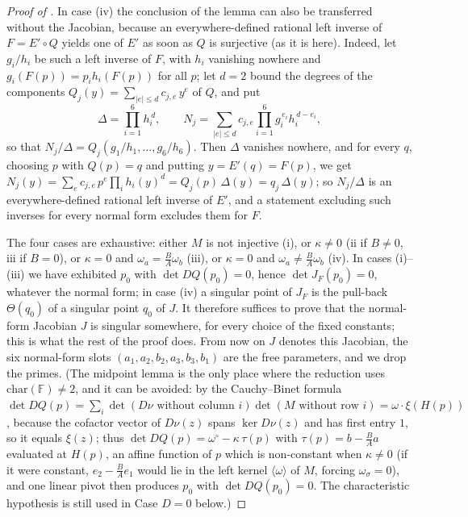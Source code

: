 \begin{proof}[Proof of ]
In case (iv) the conclusion of the lemma can also be transferred without the Jacobian,
because an everywhere-defined rational left inverse of $F=E'\circ Q$ yields one of $E'$
as soon as $Q$ is surjective (as it is here).  Indeed, let $g_i/h_i$ be such a left
inverse of $F$, with $h_i$ vanishing nowhere and $g_i(F(p))=p_ih_i(F(p))$ for all $p$;
let $d=2$ bound the degrees of the components $Q_j(y)=\sum_{|e|\le d}c_{j,e}\,y^e$ of
$Q$, and put
\[
   \Delta=\prod_{i=1}^6h_i^{\,d},\qquad
   N_j=\sum_{|e|\le d}c_{j,e}\prod_{i=1}^6g_i^{\,e_i}h_i^{\,d-e_i},
\]
so that $N_j/\Delta=Q_j(g_1/h_1,\dots,g_6/h_6)$.  Then $\Delta$ vanishes nowhere, and for
every $q$, choosing $p$ with $Q(p)=q$ and putting $y=E'(q)=F(p)$, we get
$N_j(y)=\sum_ec_{j,e}\,p^e\prod_ih_i(y)^d=Q_j(p)\,\Delta(y)=q_j\,\Delta(y)$; so
$N_j/\Delta$ is an everywhere-defined rational left inverse of $E'$, and a statement
excluding such inverses for every normal form excludes them for $F$.

\smallskip
The four cases are exhaustive: either $M$ is not injective (i), or $\kappa\neq0$
(ii if $B\neq0$, iii if $B=0$), or $\kappa=0$ and $\omega_a=\frac BA\omega_b$ (iii), or
$\kappa=0$ and $\omega_a\neq\frac BA\omega_b$ (iv).  In cases (i)--(iii) we have
exhibited $p_0$ with $\det DQ(p_0)=0$, hence $\det J_F(p_0)=0$, whatever the normal
form; in case (iv) a singular point of $J_F$ is the pull-back $\Theta(q_0)$ of a
singular point $q_0$ of $J$.  It therefore suffices to prove that the normal-form
Jacobian $J$ is singular somewhere, for every choice of the fixed constants; this is
what the rest of the proof does.  From now on $J$ denotes this Jacobian, the six
normal-form slots $(a_1,a_2,b_2,a_3,b_3,b_1)$ are the free parameters, and we drop the
primes.  (The midpoint lemma is the only place where the reduction uses
$\mathrm{char}(\mathbb{F})\neq2$, and it can be avoided: by the Cauchy--Binet formula
$\det DQ(p)=\sum_i\det(D\nu\text{ without column }i)\det(M\text{ without row }i)
=\omega\cdot\xi(H(p))$, because the cofactor vector of $D\nu(z)$ spans $\ker D\nu(z)$ and
has first entry $1$, so it equals $\xi(z)$; thus
$\det DQ(p)=\omega^\circ-\kappa\,\tau(p)$ with $\tau(p)=b-\frac BAa$ evaluated at $H(p)$,
an affine function of $p$ which is non-constant when $\kappa\neq0$ (if it were constant,
$e_2-\frac BAe_1$ would lie in the left kernel $\langle\omega\rangle$ of $M$, forcing
$\omega_\sigma=0$), and one linear pivot then produces $p_0$ with $\det DQ(p_0)=0$.  The
characteristic hypothesis is still used in Case $D=0$ below.)


\end{proof}
